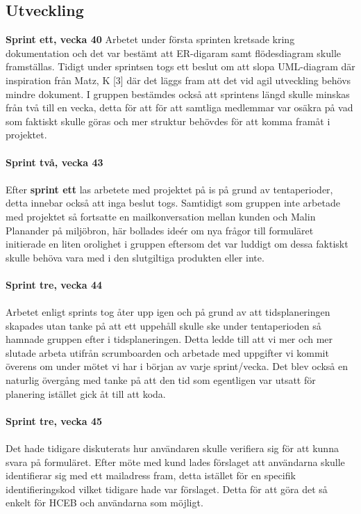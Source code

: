 \documentclass[12pt]{article}
\begin{document}
\subsection{Utveckling}
\textbf{Sprint ett, vecka 40}
Arbetet under första sprinten kretsade kring dokumentation och det var bestämt att ER-digaram samt flödesdiagram skulle framställas. Tidigt under sprintsen togs ett beslut om att slopa UML-diagram där inspiration från Matz, K [3] där det läggs fram att det vid agil utveckling behövs mindre dokument. 
I gruppen bestämdes också att sprintens längd skulle minskas från två till en vecka, detta för att för att samtliga medlemmar var osäkra på vad som faktiskt skulle göras och mer struktur behövdes för att komma framåt i projektet. \\\\
\textbf{Sprint två, vecka 43}\\\\
Efter \textbf{sprint ett} las arbetete med projektet på is på grund av tentaperioder, detta innebar också att inga beslut togs. Samtidigt som gruppen inte arbetade med projektet så fortsatte en mailkonversation mellan kunden och Malin Planander på miljöbron, här bollades ideér om nya frågor till formuläret initierade en liten orolighet i gruppen eftersom det var luddigt om dessa faktiskt skulle behöva vara med i den slutgiltiga produkten eller inte.\\\\
\textbf{Sprint tre, vecka 44}\\\\
Arbetet enligt sprints tog åter upp igen och på grund av att tidsplaneringen skapades utan tanke på att ett uppehåll skulle ske under tentaperioden så hamnade gruppen efter i tidsplaneringen. Detta ledde till att vi mer och mer slutade arbeta utifrån scrumboarden och arbetade med uppgifter vi kommit överens om under mötet vi har i början av varje sprint/vecka. Det blev också en naturlig övergång med tanke på att den tid som egentligen var utsatt för planering istället gick åt till att koda. \\\\
\textbf{Sprint tre, vecka 45} \\\\
Det hade tidigare diskuterats hur användaren skulle verifiera sig för att kunna svara på formuläret. Efter möte med kund lades förslaget att användarna skulle identifierar sig med ett mailadress fram, detta istället för en specifik identifieringskod vilket tidigare hade var förslaget. Detta för att göra det så enkelt för HCEB och användarna som möjligt.\\
\end{document}
